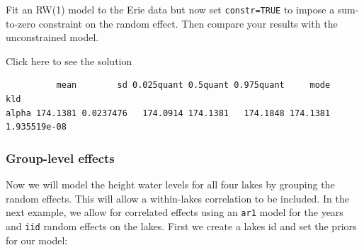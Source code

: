 \documentclass[
  letterpaper,
  DIV=11,
  numbers=noendperiod]{scrartcl}
\newenvironment{Shaded}{\begin{snugshade}}{\end{snugshade}}
\newcommand{\AttributeTok}[1]{\textcolor[rgb]{0.40,0.45,0.13}{#1}}
\newcommand{\CommentTok}[1]{\textcolor[rgb]{0.37,0.37,0.37}{#1}}
\newcommand{\ConstantTok}[1]{\textcolor[rgb]{0.56,0.35,0.01}{#1}}
\newcommand{\DecValTok}[1]{\textcolor[rgb]{0.68,0.00,0.00}{#1}}
\newcommand{\ErrorTok}[1]{\textcolor[rgb]{0.68,0.00,0.00}{#1}}
\newcommand{\FunctionTok}[1]{\textcolor[rgb]{0.28,0.35,0.67}{#1}}
\newcommand{\NormalTok}[1]{\textcolor[rgb]{0.00,0.23,0.31}{#1}}
\newcommand{\OtherTok}[1]{\textcolor[rgb]{0.00,0.23,0.31}{#1}}
\newcommand{\SpecialCharTok}[1]{\textcolor[rgb]{0.37,0.37,0.37}{#1}}
\newcommand{\StringTok}[1]{\textcolor[rgb]{0.13,0.47,0.30}{#1}}
\begin{document}
\begin{tcolorbox}[enhanced jigsaw, bottomrule=.15mm, colback=white, opacityback=0, breakable, opacitybacktitle=0.6, title={Task}, arc=.35mm, titlerule=0mm, coltitle=black, colframe=quarto-callout-warning-color-frame, toprule=.15mm, toptitle=1mm, leftrule=.75mm, left=2mm, colbacktitle=quarto-callout-warning-color!10!white, bottomtitle=1mm, rightrule=.15mm]

Fit an RW(1) model to the Erie data but now set \texttt{constr=TRUE} to
impose a sum-to-zero constraint on the random effect. Then compare your
results with the unconstrained model.

Click here to see the solution

\begin{Shaded}
\end{Shaded}

\begin{verbatim}
          mean        sd 0.025quant 0.5quant 0.975quant     mode          kld
alpha 174.1381 0.0237476   174.0914 174.1381   174.1848 174.1381 1.935519e-08
\end{verbatim}

\end{tcolorbox}

\subsubsection{Group-level effects}\label{group-level-effects}

Now we will model the height water levels for all four lakes by grouping
the random effects. This will allow a within-lakes correlation to be
included. In the next example, we allow for correlated effects using an
\texttt{ar1} model for the years and \texttt{iid} random effects on the
lakes. First we create a lakes id and set the priors for our model:
\end{document}
